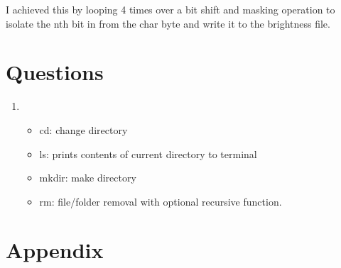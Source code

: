 \documentclass[11pt]{article}
\begin{document}
\begin{preview}
        I achieved this by looping 4 times over a bit shift and masking operation to isolate the nth bit in from the char byte and write it to the brightness file.

    \section*{Questions}
    \begin{enumerate}
        \item \begin{itemize}
                  \item cd: change directory
                  \item ls: prints contents of current directory to terminal
                  \item mkdir: make directory
                  \item rm: file/folder removal with optional recursive function.
              \end{itemize}
    \end{enumerate}

    \section*{Appendix}
    
\end{preview}
\end{document}
